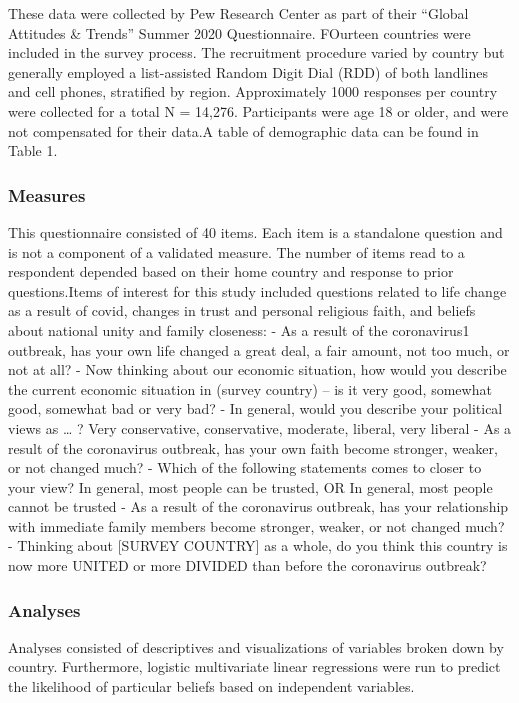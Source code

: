 \documentclass[
  english,
  man]{apa6}
\begin{document}
These data were collected by Pew Research Center as part of their \enquote{Global Attitudes \& Trends} Summer 2020 Questionnaire. FOurteen countries were included in the survey process. The recruitment procedure varied by country but generally employed a list-assisted Random Digit Dial (RDD) of both landlines and cell phones, stratified by region. Approximately 1000 responses per country were collected for a total N = 14,276. Participants were age 18 or older, and were not compensated for their data.A table of demographic data can be found in Table 1.

\hypertarget{measures}{%
\subsubsection{Measures}\label{measures}}

This questionnaire consisted of 40 items. Each item is a standalone question and is not a component of a validated measure. The number of items read to a respondent depended based on their home country and response to prior questions.Items of interest for this study included questions related to life change as a result of covid, changes in trust and personal religious faith, and beliefs about national unity and family closeness:
- As a result of the coronavirus1 outbreak, has your own life changed a great deal, a fair amount, not too much, or not at all?
- Now thinking about our economic situation, how would you describe the current economic situation in (survey country) -- is it very good, somewhat good, somewhat bad or very bad?
- In general, would you describe your political views as \ldots{} ? Very conservative, conservative, moderate, liberal, very liberal
- As a result of the coronavirus outbreak, has your own faith become stronger, weaker, or not changed much?
- Which of the following statements comes to closer to your view? In general, most people can be trusted, OR In general, most people cannot be trusted
- As a result of the coronavirus outbreak, has your relationship with immediate family members become stronger, weaker, or not changed much?
- Thinking about {[}SURVEY COUNTRY{]} as a whole, do you think this country is now more UNITED or more DIVIDED than before the coronavirus outbreak?

\hypertarget{analyses}{%
\subsubsection{Analyses}\label{analyses}}

Analyses consisted of descriptives and visualizations of variables broken down by country. Furthermore, logistic multivariate linear regressions were run to predict the likelihood of particular beliefs based on independent variables.
\end{document}
